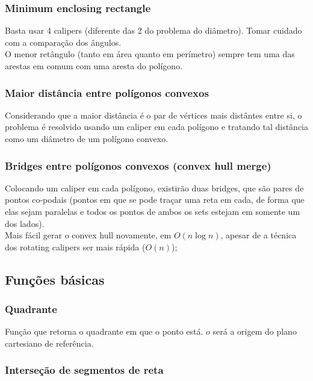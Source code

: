 \subsubsection{Minimum enclosing rectangle}
Basta usar 4 calipers (diferente das 2 do problema do di\^{a}metro). Tomar cuidado com a compara\c{c}\~{a}o dos \^{a}ngulos.
\\ O menor ret\^{a}ngulo (tanto em \'{a}rea quanto em per\'{i}metro) sempre tem uma das arestas em comum com uma aresta do pol\'{i}gono.
\divisor

\subsubsection{Maior dist\^{a}ncia entre pol\'{i}gonos convexos}
Considerando que a maior dist\^{a}ncia \'{e} o par de v\'{e}rtices mais dist\^{a}ntes entre si, o problema \'{e}  resolvido usando um caliper em cada pol\'{i}gono e tratando tal dist\^{a}ncia como um di\^{a}metro de um pol\'{i}gono convexo.
\divisor

\subsubsection{Bridges entre pol\'{i}gonos convexos (convex hull merge)}
Colocando um caliper em cada pol\'{i}gono, existir\~{a}o duas bridges, que s\~{a}o pares de pontos co-podais (pontos em que se pode tra\c{c}ar uma reta em cada, de forma que elas sejam paralelas e todos os pontos de ambos os sets estejam em somente um dos lados).
\\ Mais f\'{a}cil gerar o convex hull novamente, em $O(n \log{n})$, apesar de a t\'{e}cnica dos rotating calipers ser mais r\'{a}pida ($O(n)$);
\divisor

\subsection{Fun\c{c}\~{o}es b\'{a}sicas}
\subsubsection{Quadrante}
Fun\c{c}\~{a}o que retorna o quadrante em que o ponto est\'{a}. $o$ ser\'{a} a origem do plano cartesiano de refer\^{e}ncia.
\divisor

\subsubsection{Interse\c{c}\~{a}o de segmentos de reta}
\divisor

